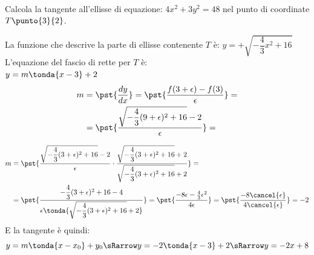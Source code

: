 \begin{esempio} {~}

\begin{minipage}{.44\textwidth} Calcola la tangente all'ellisse di equazione: 
\(4x^2+3y^2=48\) nel punto di coordinate \(T\punto{3}{2}\).

La funzione che descrive la parte di ellisse contenente \(T\) è: 
\(y=+\sqrt{-\dfrac{4}{3}x^2+16}\)\\ L'equazione del fascio di rette per \(T\) 
è:\\ \(y=m\tonda{x-3}+2\) \begin{align*} m&=\pst{\dfrac{d y}{d x}}= 
\pst{\dfrac{f(3+\epsilon)-f(3)}{\epsilon}}=\\ 
&=\pst{\dfrac{\sqrt{-\dfrac{4}{3}(9+\epsilon)^2+16}-2}{\epsilon}}= \end{align*} 
\end{minipage} \hfill \begin{minipage}{.54\textwidth} 
\begin{center}\iperellisse\end{center} \end{minipage} \begin{align*} 
m&=\pst{\dfrac{\sqrt{-\dfrac{4}{3}(3+\epsilon)^2+16}-2}{\epsilon} \cdot 
\dfrac{\sqrt{-\dfrac{4}{3}(3+\epsilon)^2+16}+2} 
{\sqrt{-\dfrac{4}{3}(3+\epsilon)^2+16}+2}}=\\ 
&=\pst{\dfrac{-\dfrac{4}{3}(3+\epsilon)^2+16-4} { 
\epsilon\tonda{\sqrt{-\dfrac{4}{3}(3+\epsilon)^2+16}+2}}}= 
\pst{\dfrac{-8\epsilon-\frac{4}{3}\epsilon^2}{4 \epsilon}}= \pst{\dfrac{-8 
\cancel{\epsilon}}{4 \cancel{\epsilon}}}=-2 \end{align*} E la tangente è quindi: 
\[y=m \tonda{x-x_0}+y_0 \sRarrow y=-2 \tonda{x-3}+2 \sRarrow y=-2x+8\]

\end{esempio}

